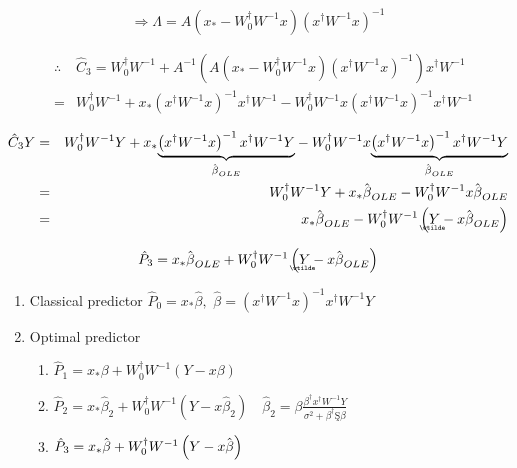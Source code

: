 \documentclass{article}
\begin{document}
\begin{equation*}
\Rightarrow \Lambda =A\left( x_{\ast }-W_{0}^{\dagger }W^{-1}x\right) \left(
x^{\dagger }W^{-1}x\right) ^{-1}
\end{equation*}

\begin{eqnarray*}
&\therefore &\hat{C}_{3}=W_{0}^{\dagger }W^{-1}+A^{-1}\left( A\left( x_{\ast
}-W_{0}^{\dagger }W^{-1}x\right) \left( x^{\dagger }W^{-1}x\right)
^{-1}\right) x^{\dagger }W^{-1} \\
&=&W_{0}^{\dagger }W^{-1}+x_{\ast }\left( x^{\dagger }W^{-1}x\right)
^{-1}x^{\dagger }W^{-1}-W_{0}^{\dagger }W^{-1}x\left( x^{\dagger
}W^{-1}x\right) ^{-1}x^{\dagger }W^{-1}
\end{eqnarray*}

\begin{eqnarray*}
\hat{C}_{3}Y &=&W_{0}^{\dagger }W^{-1}Y+x_{\ast }\underset{\hat{\beta}_{OLE}}%
{\underbrace{\left( x^{\dagger }W^{-1}x\right) ^{-1}x^{\dagger }W^{-1}Y}}%
-W_{0}^{\dagger }W^{-1}x\underset{\hat{\beta}_{OLE}}{\underbrace{\left(
x^{\dagger }W^{-1}x\right) ^{-1}x^{\dagger }W^{-1}Y}} \\
&=&W_{0}^{\dagger }W^{-1}Y+x_{\ast }\hat{\beta}_{OLE}-W_{0}^{\dagger }W^{-1}x%
\hat{\beta}_{OLE} \\
&=&x_{\ast }\hat{\beta}_{OLE}-W_{0}^{\dagger }W^{-1}\left( 
\underaccent{\wtilde}{Y}%
-x\hat{\beta}_{OLE}\right)
\end{eqnarray*}

\begin{equation*}
\therefore \hat{P}_{3}=x_{\ast }\hat{\beta}_{OLE}+W_{0}^{\dagger
}W^{-1}\left( 
\underaccent{\wtilde}{Y}%
-x\hat{\beta}_{OLE}\right)
\end{equation*}

\bigskip

\begin{enumerate}
\item Classical predictor $\hat{P}_{0}=x_{\ast }\hat{\beta},$ $\hat{\beta}%
=\left( x^{\dagger }W^{-1}x\right) ^{-1}x^{\dagger }W^{-1}Y$

\item Optimal predictor

\begin{enumerate}
\item $\hat{P}_{1}=x_{\ast }\beta +W_{0}^{\dagger }W^{-1}\left( Y-x\beta
\right) $

\item $\hat{P}_{2}=x_{\ast }\hat{\beta}_{2}+W_{0}^{\dagger }W^{-1}\left( Y-x%
\hat{\beta}_{2}\right) \quad \hat{\beta}_{2}=\beta \frac{\beta ^{\dagger
}x^{\dagger }W^{-1}Y}{\sigma ^{2}+\beta ^{\dagger }\text{\c{S}}\beta }$

\item $\hat{P}_{3}=x_{\ast }\hat{\beta}+W_{0}^{\dagger }W^{-1}\left( Y-x\hat{%
\beta}\right) $
\end{enumerate}
\end{enumerate}
\end{document}

